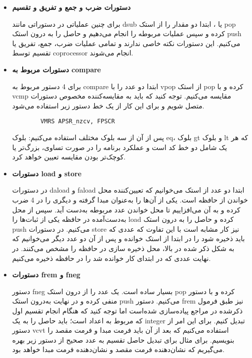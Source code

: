 \begin{itemize}
	\item \textbf{
		دستورات ضرب و جمع و تفریق و تقسیم
	}
	
	برای چنین عملیاتی در دستوراتی مانند dsub یا 
	،
	ابتدا دو مقدار را از استک pop کرده و سپس عملیات مربوطه را انجام می‌دهیم و حاصل را به درون استک push می‌کنیم. این دستورات نکته خاصی ندارند و تمامی عملیات ضرب، جمع، تفریق یا تقسیم توسط coprocessor انجام می‌شوند.
	
	\item \textbf{
		دستورات مربوط به compare
	}
	
	برای 4 دستور مربوط به compare ابتدا دو عدد را با vpop از استک pop کرده و با vcmp مقایسه می‌کنیم. توجه کنید که باید به مقایسه‌کننده مخصوص دستورات
	متصل شویم و برای این کار از یک خط دستور زیر استفاده می‌شود.
	\begin{latin}
		\begin{verbatim}
		VMRS APSR_nzcv, FPSCR 
		\end{verbatim}
	\end{latin}
	
	پس از آن از سه بلوک مختلف استفاده می‌کنیم: بلوک eq، بلوک gt و بلوک lt که هر یک شامل دو خط کد است و عملکرد برنامه را در صورت تساوی، بزرگ‌تر یا کوچک‌تر بودن مقایسه تعیین خواهد کرد.
	
	
	\item \textbf{
		دستورات load و store
	}
	
	در دستورات daload و faload ابتدا دو عدد از استک می‌خوانیم که تعیین‌کننده محل خواندن از حافظه است. یکی از آن‌ها را به‌عنوان مبدا گرفته و دیگری را در 4 ضرب کرده و به آن می‌افزاییم تا محل خواندن عدد مربوطه به‌دست آید. سپس از محل به‌دست‌آمده در حافظه یکی از ثبات‌ها را load کرده و حاصل را به درون استک push می‌کنیم. در دستورات store نیز کار مشابه است با این تفاوت که عددی که باید ذخیره شود را در ابتدا از استک خوانده و پس از آن دو عدد دیگر می‌خوانیم که به شکل ذکر شده در بالا، محل ذخیره سازی در حافظه را مشخص می‌کنند. در نهایت عددی که در ابتدای کار خوانده شد را در حافظه ذخیره می‌کنیم.
	
	\item\textbf{
		دستورات frem و fneg
	}
	
	دستور fneg بسیار ساده است. یک عدد را از درون استک pop کرده و با دستور
	منفی کرده و در نهایت به‌درون استک push می‌کنیم. دستور frem نیز طبق فرمول ذکرشده در مراجع پیاده‌سازی شده‌است اما توجه کنید که هنگام انجام تقسیم اول که مربوط به اعداد
	است؛ باید حاصل را به یک integer تبدیل کنیم. برای این امر از دستور vcvt استفاده می‌کنیم که بعد از آن باید فرمت مبدا و فرمت مقصد را بنویسیم. برای مثال برای تبدیل حاصل
	تقسیم به عدد صحیح از دستور زیر بهره می‌گیریم که
	نشان‌دهنده فرمت مقصد و
	نشان‌دهنده فرمت مبدا خواهد بود.
	

\end{itemize}
